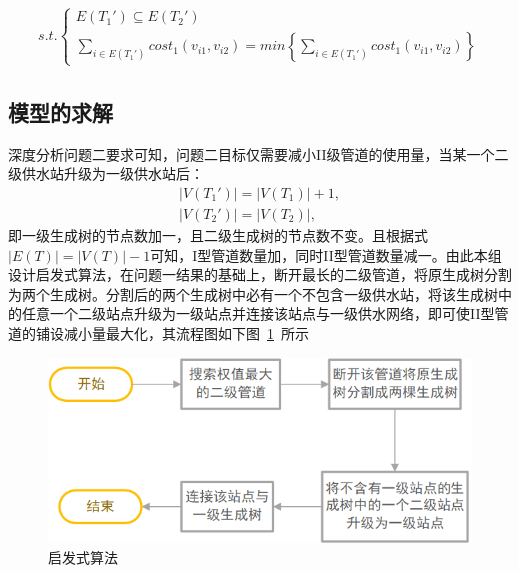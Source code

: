 \documentclass{whutmod}
\begin{document}
			\begin{gather*}
			s.t.\left\{\begin{matrix}
			E(T_{1}')\subseteq  E(T_{2}')\\ 
			\sum_{i\in E(T_1') }cost_1(v_{i1},v_{i2})=min\left \{ 	\sum_{i\in E(T_1') }cost_1(v_{i1},v_{i2}) \right \} 
			\end{matrix}\right.
			\end{gather*}
		\subsection{模型的求解}
		深度分析问题二要求可知，问题二目标仅需要减小II级管道的使用量，当某一个二级供水站升级为一级供水站后：
			\begin{gather*}
			|V(T_{1}')|= |V(T_{1})|+1,\\
			|V(T_{2}')|=|V(T_{2})|,
	        \end{gather*}
	    即一级生成树的节点数加一，且二级生成树的节点数不变。且根据式$|E(T)|=|V(T)|-1 $可知，I型管道数量加，同时II型管道数量减一。由此本组设计启发式算法，在问题一结果的基础上，断开最长的二级管道，将原生成树分割为两个生成树。分割后的两个生成树中必有一个不包含一级供水站，将该生成树中的任意一个二级站点升级为一级站点并连接该站点与一级供水网络，即可使II型管道的铺设减小量最大化，其流程图如下图~\ref{gfhssssd}~所示
	        \begin{figure}[H]
	        	\centering
	        	\includegraphics[width=\textwidth]{figures/2163.png}
	        	\caption{启发式算法}\label{gfhssssd}
	        \end{figure}
\end{document}
